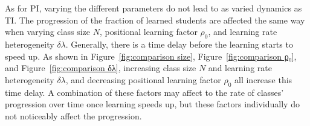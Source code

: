 \documentclass[twocolumn,secnumarabic,amssymb, nobibnotes, aps, prd]{revtex4-2}
\begin{document}
    
    

    As for PI, varying the different parameters do not lead to as varied dynamics as TI.
    The progression of the fraction of learned students are affected the same way when varying class size $N$, positional learning factor $\rho_0$, and learning rate heterogeneity $\delta\lambda$.
    Generally, there is a time delay before the learning starts to speed up.
    As shown in Figure~\ref{fig:comparison size}, Figure~\ref{fig:comparison ρ₀}, and Figure~\ref{fig:comparison δλ}, increasing class size $N$ and learning rate heterogeneity $\delta\lambda$, and decreasing positional learning factor $\rho_0$ all increase this time delay.
    A combination of these factors may affect to the rate of classes' progression over time once learning speeds up, but these factors individually do not noticeably affect the progression.
    
\end{document}
